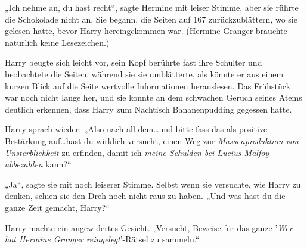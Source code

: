 
„Ich nehme an, du hast recht“, sagte Hermine mit leiser Stimme, aber sie rührte die Schokolade nicht an. Sie begann, die Seiten auf 167 zurückzublättern, wo sie gelesen hatte, bevor Harry hereingekommen war. (Hermine Granger brauchte natürlich keine Lesezeichen.)

Harry beugte sich leicht vor, sein Kopf berührte fast ihre Schulter und beobachtete die Seiten, während sie sie umblätterte, als könnte er aus einem kurzen Blick auf die Seite wertvolle Informationen herauslesen. Das Frühstück war noch nicht lange her, und sie konnte an dem schwachen Geruch seines Atems deutlich erkennen, dass Harry zum Nachtisch Bananenpudding gegessen hatte.

Harry sprach wieder. „Also nach all dem…und bitte fass das als positive Bestärkung auf…hast du wirklich versucht, einen Weg zur \emph{Massenproduktion von Unsterblichkeit} zu erfinden, damit ich \emph{meine Schulden bei Lucius Malfoy abbezahlen} kann?“

„Ja“, sagte sie mit noch leiserer Stimme. Selbst wenn sie versuchte, wie Harry zu denken, schien sie den Dreh noch nicht raus zu haben. „Und was hast du die ganze Zeit gemacht, Harry?“

Harry machte ein angewidertes Gesicht. „Versucht, Beweise für das ganze '\emph{Wer hat Hermine Granger reingelegt}'-Rätsel zu sammeln.“

